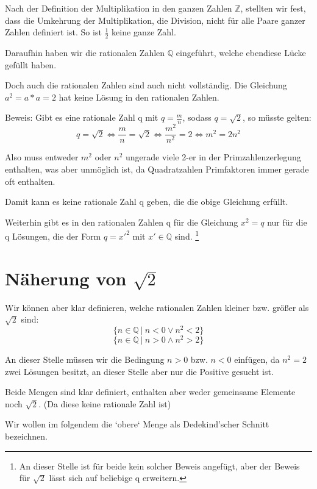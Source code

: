 \documentclass[12pt]{article}
\begin{document}
    Nach der Definition der Multiplikation in den ganzen Zahlen $\mathbb{Z}$, stellten wir fest, dass
    die Umkehrung der Multiplikation, die Division, nicht für alle Paare ganzer Zahlen definiert ist.
    So ist $\frac{1}{2}$ keine ganze Zahl.

    Daraufhin haben wir die rationalen Zahlen $\mathbb{Q}$ eingeführt, welche ebendiese Lücke gefüllt haben.

    Doch auch die rationalen Zahlen sind auch nicht vollständig.
    Die Gleichung $a^2 = a * a = 2$ hat keine Lösung in den rationalen Zahlen.
    
    Beweis:
    Gibt es eine rationale Zahl q mit $q = \frac{m}{n}$, sodass $q = \sqrt{2}$, so müsste gelten:
    \[
        q = \sqrt{2} \Leftrightarrow \frac{m}{n} = \sqrt{2} \Leftrightarrow \frac{m^2}{n^2} = 2 \Leftrightarrow m^2 = 2n^2
    \]

    Also muss entweder $m^2$ oder $n^2$ ungerade viele 2-er in der
    Primzahlenzerlegung enthalten, was aber unmöglich ist, da Quadratzahlen Primfaktoren immer gerade oft enthalten.
    
    Damit kann es keine rationale Zahl q geben, die die obige Gleichung erfüllt.

    Weiterhin gibt es in den rationalen Zahlen q für die Gleichung $x^2 = q$ nur für die q Lösungen,
    die der Form $q = x'^2$ mit $x' \in \mathbb{Q}$ sind.
    \footnote{
        An dieser Stelle ist für beide kein solcher Beweis angefügt, aber der Beweis für $\sqrt{2}$ lässt
        sich auf beliebige q erweitern.
    }

    \section{Näherung von $\sqrt{2}$}

    Wir können aber klar definieren, welche rationalen Zahlen kleiner bzw. größer als $\sqrt{2}$ sind:
    \[\{n \in \mathbb{Q} \mspace{4mu} | \mspace{4mu} n < 0 \lor n^2 < 2\}\]
    \[\{n \in \mathbb{Q} \mspace{4mu} | \mspace{4mu} n > 0 \land n^2 > 2\}\]

    An dieser Stelle müssen wir die Bedingung $n > 0$ bzw. $n < 0$ einfügen, da $n ^ 2 = 2$ zwei Lösungen besitzt,
    an dieser Stelle aber nur die Positive gesucht ist.

    Beide Mengen sind klar definiert, enthalten aber weder gemeinsame Elemente noch $\sqrt{2}$.
    (Da diese keine rationale Zahl ist)

    Wir wollen im folgendem die `obere` Menge als Dedekind'scher Schnitt bezeichnen.
\end{document}
